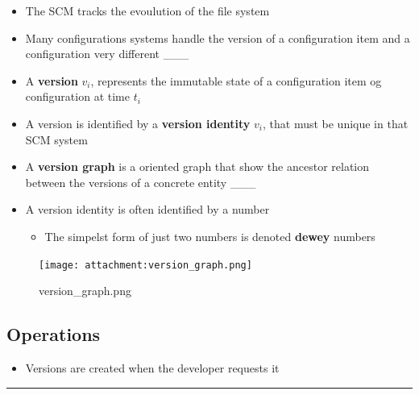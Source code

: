 \documentclass[11pt]{article}
\providecommand{\tightlist}{%
      \setlength{\itemsep}{0pt}\setlength{\parskip}{0pt}}
\begin{document}
\begin{itemize}
\item
  The SCM tracks the evoulution of the file system
\item
  Many configurations systems handle the version of a configuration item
  and a configuration very different \_\_\_
\item
  A \textbf{version} \(v_i\), represents the immutable state of a
  configuration item og configuration at time \(t_i\)
\item
  A version is identified by a \textbf{version identity} \(v_i\), that
  must be unique in that SCM system
\item
  A \textbf{version graph} is a oriented graph that show the ancestor
  relation between the versions of a concrete entity \_\_\_
\item
  A version identity is often identified by a number

  \begin{itemize}
  \tightlist
  \item
    The simpelst form of just two numbers is denoted \textbf{dewey}
    numbers
  \end{itemize}
\end{itemize}

\begin{figure}
\centering
\texttt{[image: attachment:version\_graph.png]}
\caption{version\_graph.png}
\end{figure}

\hypertarget{operations}{%
\subsection{Operations}\label{operations}}

\begin{itemize}
\tightlist
\item
  Versions are created when the developer requests it
\end{itemize}

\begin{center}\rule{0.5\linewidth}{\linethickness}\end{center}
\end{document}

